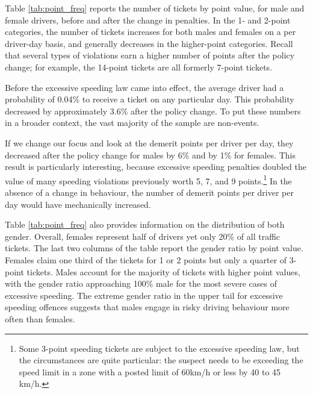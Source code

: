 

Table \ref{tab:point_freq} reports 
the number of tickets by point value, 
for male and female drivers, before and after the
change in penalties. 
%
In the 1- and 2-point categories, the number of tickets increases 
for both males and females on a per driver-day basis, 
and generally decreases in the higher-point categories. 
% 
Recall that several types of violations
earn a higher number of points after the policy change; 
for example, 
the 14-point tickets are all formerly 7-point tickets.

Before the excessive speeding law came into effect, 
the average driver had a probability of 0.04\% to receive a ticket 
on any particular day. This probability decreased by approximately 3.6\% after the policy change.
To put these numbers in a broader context, 
the vast majority of the sample are non-events. 

If we change our focus and look at the demerit points per driver per day, 
they decreased after the policy change for males by 6\% and by 1\% for females. 
This result is particularly interesting, 
because excessive speeding penalties doubled the value of many 
speeding violations previously worth 5, 7, and 9 points.\footnote{%
Some 3-point speeding tickets are subject to the excessive speeding law, 
but the circumstances are quite particular: 
the suspect needs to be exceeding the speed limit in a zone 
with a posted limit of 60km/h or less by 40 to 45 km/h.}
In the absence of a change in behaviour, 
the number of demerit points per driver per day 
would have mechanically increased. 


Table \ref{tab:point_freq} also provides information on the distribution of both gender. Overall, females represent half of drivers 
yet only 20\% of all traffic tickets. 
%
The last two columns of the table
report the gender ratio by point value.
% 
Females claim one third of the tickets for 1 or 2 points
but only a quarter of 3-point tickets. 
Males account for the majority of tickets with higher point values, 
with the gender ratio approaching 100\% male 
for the most severe cases of excessive speeding. 
% 
The extreme gender ratio in the upper tail for excessive speeding offences 
suggests that males engage in risky driving behaviour 
more often than females. 

%



